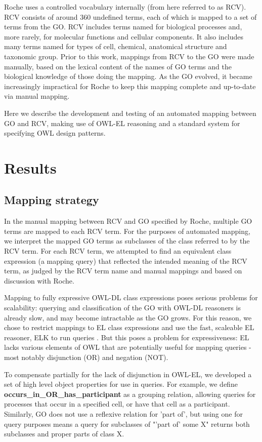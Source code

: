 \documentclass[runningheads,a4paper]{llncs}
\begin{document}
{{Roche uses a controlled vocabulary internally (from here referred to as RCV).  RCV consists of around 360 undefined terms, each of which is mapped to a set of terms from the GO. RCV includes terms named for biological processes and, more rarely, for molecular functions and cellular components.  It also includes many terms named for types of cell, chemical, anatomical structure and taxonomic group. Prior to this work, mappings from RCV to the GO were made manually, based on the lexical content of the names of GO terms and the biological knowledge of those doing the mapping.  As the GO evolved, it became increasingly impractical for Roche to keep this mapping complete and up-to-date via manual mapping.

Here we describe the development and testing of an automated mapping between GO and RCV, making use of OWL-EL reasoning and a standard system for specifying OWL design patterns.

\section{Results}

\subsection{Mapping strategy}

In the manual mapping between RCV and GO specified by Roche, multiple GO terms are mapped to each RCV term. For the purposes of automated mapping, we interpret the mapped GO terms as subclasses of the class referred to by the RCV term. For each RCV term, we attempted to find an equivalent class expression (a mapping query) that reflected the intended meaning of the RCV term, as judged by the RCV term name and manual mappings and based on discussion with Roche.

Mapping to fully expressive OWL-DL class expressions poses serious problems for scalability: querying and classification of the GO with OWL-DL reasoners is already slow, and may become intractable as the GO grows.  For this reason, we chose to restrict mappings to EL class expressions and use the fast, scaleable EL reasoner, ELK to run queries \cite{kazakov2012}. But this poses a problem for expressiveness: EL lacks various elements of OWL that are potentially useful for mapping queries - most notably disjunction (OR) and negation (NOT).  

To compensate partially for the lack of disjunction in OWL-EL, we developed a set of high level object properties for use in queries. For example, we define \textbf{occurs\_in\_OR\_has\_participant} as a grouping relation, allowing queries for processes that occur in a specified cell, or have that cell as a participant. Similarly, GO does not use a reflexive relation for 'part of', but using one for query purposes means a query for subclasses of  "'part of' some X" returns both subclasses and proper parts of class X.

}}
\end{document}
